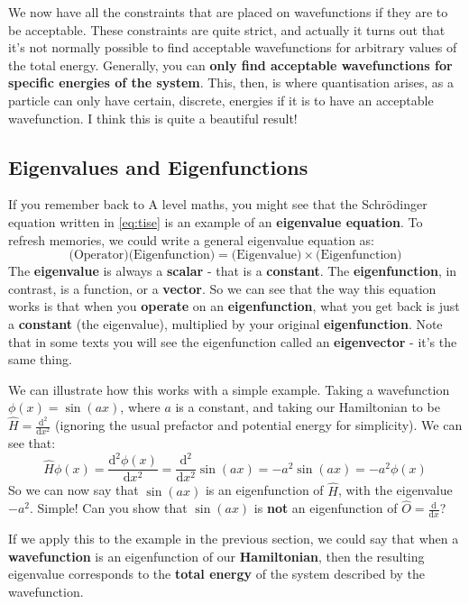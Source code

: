 \documentclass{memoir}[11pt,oneside,a4paper,openany]
\begin{document}
We now have all the constraints that are placed on wavefunctions if they are to be acceptable. These constraints are quite strict, and actually it turns out that it's not normally possible to find acceptable wavefunctions for arbitrary values of the total energy. Generally, you can \textbf{only find acceptable wavefunctions for specific energies of the system}. This, then, is where quantisation arises, as a particle can only have certain, discrete, energies if it is to have an acceptable wavefunction. I think this is quite a beautiful result!

\subsection{Eigenvalues and Eigenfunctions}
If you remember back to A level maths, you might see that the Schr{\"o}dinger equation written in \autoref{eq:tise} is an example of an \textbf{eigenvalue equation}. To refresh memories, we could write a general eigenvalue equation as:
\begin{equation}
	\text{(Operator)(Eigenfunction)} = \text{(Eigenvalue)}\times\text{(Eigenfunction)}
\end{equation}
The \textbf{eigenvalue} is always a \textbf{scalar} - that is a \textbf{constant}. The \textbf{eigenfunction}, in contrast, is a function, or a \textbf{vector}. So we can see that the way this equation works is that when you \textbf{operate} on an \textbf{eigenfunction}, what you get back is just a \textbf{constant} (the eigenvalue), multiplied by your original \textbf{eigenfunction}. Note that in some texts you will see the eigenfunction called an \textbf{eigenvector} - it's the same thing.  

We can illustrate how this works with a simple example. Taking a wavefunction $\phi(x) = \sin(ax)$, where $a$ is a constant, and taking our Hamiltonian to be $\hat{H} = \frac{\mathrm{d}^2}{\mathrm{d}x^2}$ (ignoring the usual prefactor and potential energy for simplicity). We can see that:
\begin{equation}
	\hat{H}\phi(x) = \frac{\mathrm{d}^2\phi(x)}{\mathrm{d}x^2} = \frac{\mathrm{d}^2}{\mathrm{d}x^2} \sin(ax) = -a^2 \sin(ax) = -a^2\phi(x)
\end{equation}
So we can now say that $\sin(ax)$ is an eigenfunction of $\hat{H}$, with the eigenvalue $-a^2$. Simple! Can you show that $\sin(ax)$ is \textbf{not} an eigenfunction of $\hat{O} = \frac{\mathrm{d}}{\mathrm{d}x}$? 

If we apply this to the example in the previous section, we could say that when a \textbf{wavefunction} is an eigenfunction of our \textbf{Hamiltonian}, then the resulting eigenvalue corresponds to the \textbf{total energy} of the system described by the wavefunction. 
\end{document}
